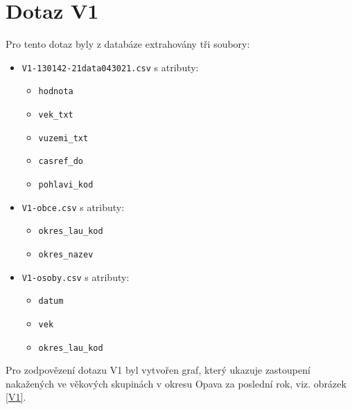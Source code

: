 \documentclass[12pt]{article}
\begin{document}
\section{Dotaz V1}
Pro tento dotaz byly z databáze extrahovány tři soubory:
\begin{itemize}
    \item \texttt{V1-130142-21data043021.csv} s atributy:
        \begin{itemize}
            \item \texttt{hodnota}
            \item \texttt{vek\_txt}
            \item \texttt{vuzemi\_txt}
            \item \texttt{casref\_do}
            \item \texttt{pohlavi\_kod}
        \end{itemize}
    \item \texttt{V1-obce.csv} s atributy:
        \begin{itemize}
            \item \texttt{okres\_lau\_kod}
            \item \texttt{okres\_nazev}
        \end{itemize}
    \item \texttt{V1-osoby.csv} s atributy:
        \begin{itemize}
            \item \texttt{datum}
            \item \texttt{vek}
            \item \texttt{okres\_lau\_kod}
        \end{itemize}
\end{itemize}
Pro zodpovězení dotazu V1 byl vytvořen graf, který ukazuje zastoupení nakažených ve věkových skupinách v okresu Opava za poslední rok, viz. obrázek \ref{V1}.
\end{document}
